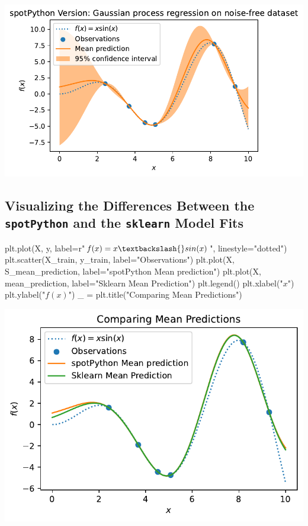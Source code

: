 \documentclass[
  letterpaper,
  DIV=11,
  numbers=noendperiod]{scrreprt}
\newenvironment{Shaded}{\begin{snugshade}}{\end{snugshade}}
\newcommand{\NormalTok}[1]{\textcolor[rgb]{0.00,0.23,0.31}{#1}}
\newcommand{\OperatorTok}[1]{\textcolor[rgb]{0.37,0.37,0.37}{#1}}
\newcommand{\StringTok}[1]{\textcolor[rgb]{0.13,0.47,0.30}{#1}}
\newcommand{\VerbatimStringTok}[1]{\textcolor[rgb]{0.13,0.47,0.30}{#1}}
\begin{document}
\includegraphics{011_num_spot_sklearn_gaussian_files/figure-pdf/cell-7-output-1.pdf}

\subsection{\texorpdfstring{Visualizing the Differences Between the
\texttt{spotPython} and the \texttt{sklearn} Model
Fits}{Visualizing the Differences Between the spotPython and the sklearn Model Fits}}\label{visualizing-the-differences-between-the-spotpython-and-the-sklearn-model-fits}

\begin{Shaded}
\begin{Highlighting}[]
\NormalTok{plt.plot(X, y, label}\OperatorTok{=}\VerbatimStringTok{r"$f(x) = x \textbackslash{}sin(x)$"}\NormalTok{, linestyle}\OperatorTok{=}\StringTok{"dotted"}\NormalTok{)}
\NormalTok{plt.scatter(X\_train, y\_train, label}\OperatorTok{=}\StringTok{"Observations"}\NormalTok{)}
\NormalTok{plt.plot(X, S\_mean\_prediction, label}\OperatorTok{=}\StringTok{"spotPython Mean prediction"}\NormalTok{)}
\NormalTok{plt.plot(X, mean\_prediction, label}\OperatorTok{=}\StringTok{"Sklearn Mean Prediction"}\NormalTok{)}
\NormalTok{plt.legend()}
\NormalTok{plt.xlabel(}\StringTok{"$x$"}\NormalTok{)}
\NormalTok{plt.ylabel(}\StringTok{"$f(x)$"}\NormalTok{)}
\NormalTok{\_ }\OperatorTok{=}\NormalTok{ plt.title(}\StringTok{"Comparing Mean Predictions"}\NormalTok{)}
\end{Highlighting}
\end{Shaded}

\includegraphics{011_num_spot_sklearn_gaussian_files/figure-pdf/cell-8-output-1.pdf}
\end{document}
